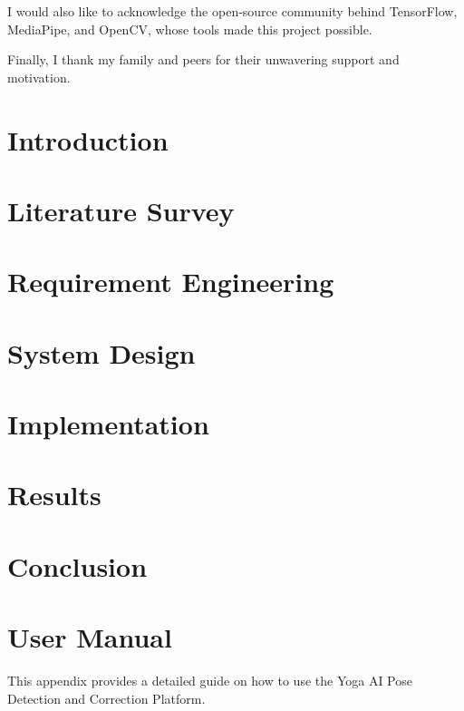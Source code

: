\documentclass[a4paper, 11pt, oneside]{report}
\begin{document}
	I would also like to acknowledge the open-source community behind TensorFlow, MediaPipe, and OpenCV, whose tools made this project possible.

	Finally, I thank my family and peers for their unwavering support and motivation.
	
	
	\vspace{1cm}
	
	\hspace{7cm}
	\tableofcontents
	\listoffigures
        \listoftables
	\chapter{Introduction}
	
        \chapter{Literature Survey}
        
        \chapter{Requirement Engineering}
        
        \chapter{System Design}
        
        \chapter{Implementation}
        
        \chapter{Results}
        
        \chapter{Conclusion}
        
        
        \appendix
        \chapter{User Manual}
        This appendix provides a detailed guide on how to use the Yoga AI Pose Detection and Correction Platform.
\end{document}
